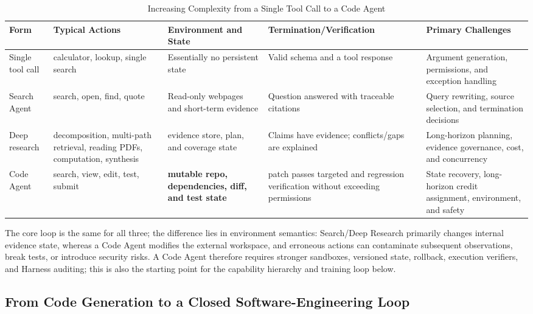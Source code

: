 \documentclass[10pt,a4paper,UTF8,fontset=none]{ctexart}
\begin{document}
\begin{table}[htbp]
\centering
\caption{Increasing Complexity from a Single Tool Call to a Code Agent}
\label{en:tab:agent-progression}
\small
\begin{tabularx}{\textwidth}{p{2.45cm}YYYY}
\toprule
Form & Typical Actions & Environment and State & Termination/Verification & Primary Challenges \\
\midrule
Single tool call & calculator, lookup, single search & Essentially no persistent state & Valid schema and a tool response & Argument generation, permissions, and exception handling \\
Search Agent & search, open, find, quote & Read-only webpages and short-term evidence & Question answered with traceable citations & Query rewriting, source selection, and termination decisions \\
Deep research & decomposition, multi-path retrieval, reading PDFs, computation, synthesis & evidence store, plan, and coverage state & Claims have evidence; conflicts/gaps are explained & Long-horizon planning, evidence governance, cost, and concurrency \\
Code Agent & search, view, edit, test, submit & \textbf{mutable repo, dependencies, diff, and test state} & patch passes targeted and regression verification without exceeding permissions & State recovery, long-horizon credit assignment, environment, and safety \\
\bottomrule
\end{tabularx}
\end{table}

The core loop is the same for all three; the difference lies in environment semantics: Search/Deep Research primarily changes internal evidence state, whereas a Code Agent modifies the external workspace, and erroneous actions can contaminate subsequent observations, break tests, or introduce security risks. A Code Agent therefore requires stronger sandboxes, versioned state, rollback, execution verifiers, and Harness auditing; this is also the starting point for the capability hierarchy and training loop below.

\subsection{From Code Generation to a Closed Software-Engineering Loop}
\end{document}
